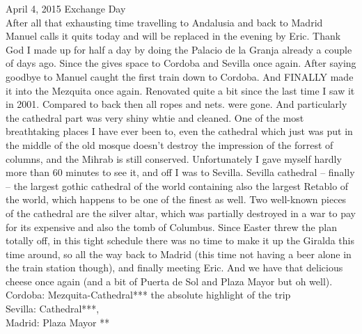April 4, 2015 Exchange Day\\
After all that exhausting time travelling to Andalusia and back to Madrid Manuel calls it quits today and will be replaced in the evening by Eric. Thank God I made up for half a day by doing the Palacio de la Granja already a couple of days ago. Since the gives space to Cordoba and Sevilla once again. After saying goodbye to Manuel caught the first train down to Cordoba. And FINALLY made it into the Mezquita once again. Renovated quite a bit since the last time I saw it in 2001. Compared to back then all ropes and nets. were gone. And particularly the cathedral part was very shiny whtie and cleaned. One of the most breathtaking places I have ever been to, even the cathedral which just was put in the middle of the old mosque doesn't destroy the impression of the forrest of columns, and the Mihrab is still conserved. Unfortunately I gave myself hardly more than 60 minutes to see it, and off I was to Sevilla. Sevilla cathedral -- finally -- the largest gothic cathedral of the world containing also the largest Retablo of the world, which happens to be one of the finest as well. Two well-known pieces of the cathedral are the silver altar, which was partially destroyed in a war to pay for its expensive and also the tomb of Columbus. Since Easter threw the plan totally off, in this tight schedule there was no time to make it up the Giralda this time around, so all the way back to Madrid (this time not having a beer alone in the train station though), and finally meeting Eric. And we have that delicious cheese once again (and a bit of Puerta de Sol and Plaza Mayor but oh well).\\

Cordoba:
Mezquita-Cathedral*** the absolute highlight of the trip\\
Sevilla:
Cathedral***,\\
Madrid:
Plaza Mayor **\\

